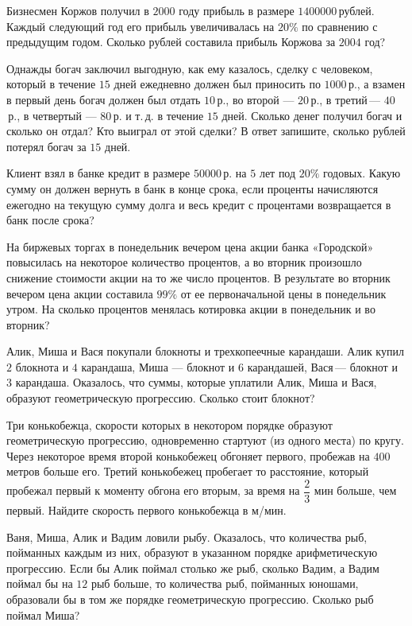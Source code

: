 %
%
\begin{class}[number=2]
	\begin{listofex}
		\item Бизнесмен Коржов получил в \( 2000 \) году прибыль в размере \( 1 400 000 \) рублей. Каждый следующий год его прибыль увеличивалась на \( 20\% \) по сравнению с предыдущим годом. Сколько рублей составила прибыль Коржова за \( 2004 \) год?
		\item Однажды богач заключил выгодную, как ему казалось, сделку с человеком, который в течение \( 15 \) дней ежедневно должен был приносить по \( 1000 \) р., а взамен в первый день богач должен был отдать \( 10 \) р., во второй --- \( 20 \) р., в третий --- \( 40 \) р., в четвертый --- \( 80 \) р. и т. д. в течение \( 15 \) дней. Сколько денег получил богач и сколько он отдал? Кто выиграл от этой сделки? В ответ запишите, сколько рублей потерял богач за \( 15 \) дней.
		\item Клиент взял в банке кредит в размере \( 50 000 \) р. на \( 5 \) лет под \( 20\% \) годовых. Какую сумму он должен вернуть в банк в конце срока, если проценты начисляются ежегодно на текущую сумму долга и весь кредит с процентами возвращается в банк после срока?
		\item На биржевых торгах в понедельник вечером цена акции банка «Городской» повысилась на некоторое количество процентов, а во вторник произошло снижение стоимости акции на то же число процентов. В результате во вторник вечером цена акции составила \( 99\% \) от ее первоначальной цены в понедельник утром. На сколько процентов менялась котировка акции в понедельник и во вторник?
		\item Алик, Миша и Вася покупали блокноты и трехкопеечные карандаши. Алик купил \( 2 \) блокнота и \( 4 \) карандаша, Миша --- блокнот и \( 6 \) карандашей, Вася --- блокнот и \( 3 \) карандаша. Оказалось, что суммы, которые уплатили Алик, Миша и Вася, образуют геометрическую прогрессию. Сколько стоит блокнот?
		\item Три конькобежца, скорости которых в некотором порядке образуют геометрическую прогрессию, одновременно стартуют (из одного места) по кругу. Через некоторое время второй конькобежец обгоняет первого, пробежав на \( 400 \) метров больше его. Третий конькобежец пробегает то расстояние, который пробежал первый к моменту обгона его вторым, за время на \( \dfrac{2}{3} \) мин больше, чем первый. Найдите скорость первого конькобежца в м/мин.
		\item Ваня, Миша, Алик и Вадим ловили рыбу. Оказалось, что количества рыб, пойманных каждым из них, образуют в указанном порядке арифметическую прогрессию. Если бы Алик поймал столько же рыб, сколько Вадим, а Вадим поймал бы на \( 12 \) рыб больше, то количества рыб, пойманных юношами, образовали бы в том же порядке геометрическую прогрессию. Сколько рыб поймал Миша?

\end{listofex}
\end{class}
